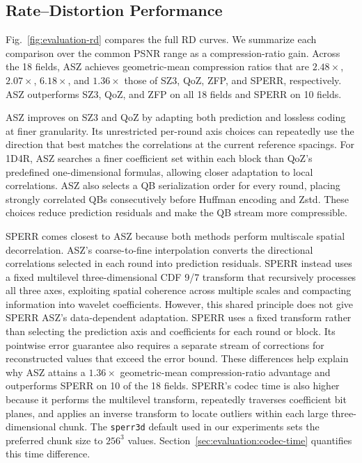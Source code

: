 \subsection{Rate--Distortion Performance}
\label{sec:evaluation:rd}

Fig.~\ref{fig:evaluation-rd} compares the full RD curves. We summarize each comparison over the common PSNR range as a compression-ratio gain. Across the 18 fields, ASZ achieves geometric-mean compression ratios that are $2.48\times$, $2.07\times$, $6.18\times$, and $1.36\times$ those of SZ3, QoZ, ZFP, and SPERR, respectively. ASZ outperforms SZ3, QoZ, and ZFP on all 18 fields and SPERR on 10 fields.

ASZ improves on SZ3 and QoZ by adapting both prediction and lossless coding at finer granularity. Its unrestricted per-round axis choices can repeatedly use the direction that best matches the correlations at the current reference spacings. For 1D4R, ASZ searches a finer coefficient set within each block than QoZ's predefined one-dimensional formulas, allowing closer adaptation to local correlations. ASZ also selects a QB serialization order for every round, placing strongly correlated QBs consecutively before Huffman encoding and Zstd. These choices reduce prediction residuals and make the QB stream more compressible.

SPERR comes closest to ASZ because both methods perform multiscale spatial decorrelation. ASZ's coarse-to-fine interpolation converts the directional correlations selected in each round into prediction residuals. SPERR instead uses a fixed multilevel three-dimensional CDF 9/7 transform that recursively processes all three axes, exploiting spatial coherence across multiple scales and compacting information into wavelet coefficients. However, this shared principle does not give SPERR ASZ's data-dependent adaptation. SPERR uses a fixed transform rather than selecting the prediction axis and coefficients for each round or block. Its pointwise error guarantee also requires a separate stream of corrections for reconstructed values that exceed the error bound. These differences help explain why ASZ attains a $1.36\times$ geometric-mean compression-ratio advantage and outperforms SPERR on 10 of the 18 fields. SPERR's codec time is also higher because it performs the multilevel transform, repeatedly traverses coefficient bit planes, and applies an inverse transform to locate outliers within each large three-dimensional chunk. The \texttt{sperr3d} default used in our experiments sets the preferred chunk size to $256^3$ values. Section~\ref{sec:evaluation:codec-time} quantifies this time difference.

